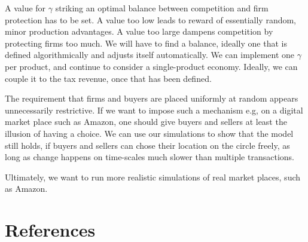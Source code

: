 \documentclass[final,3p,times,authoryear,12pt]{elsarticle}
\begin{document}
A value for $\gamma$ striking an optimal balance between competition and firm protection has to be set. 
A value too low leads to reward of essentially random, minor production advantages. 
A value too large dampens competition by protecting firms too much. 
We will have to find a balance, ideally one that is defined algorithmically and adjusts itself automatically. 
We can implement one $\gamma$ per product, and continue to consider a single-product economy. 
Ideally, we can couple it to the tax revenue, once that has been defined. 

The requirement that firms and buyers are placed uniformly at random appears unnecessarily restrictive. 
If we want to impose such a mechanism e.g, on a digital market place such as Amazon, one should give buyers and sellers at least the illusion of having a choice. 
We can use our simulations to show that the model still holds, if buyers and sellers can chose their location on the circle freely, as long as change happens on time-scales much slower than multiple transactions. 

Ultimately, we want to run more realistic simulations of real market places, such as Amazon.

\section*{References}


\end{document}

